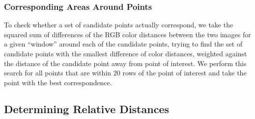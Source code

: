 \subsubsection{Corresponding Areas Around Points}
To check whether a set of candidate points actually correspond, we take the squared sum of differences of the RGB color distances between the two images for a given ``window'' around each of the candidate points, trying to find the set of candidate points with the smallest difference of color distances, weighted against the distance of the candidate point away from point of interest. We perform this search for all points that are within 20 rows of the point of interest and take the point with the best correspondence. 

\subsection{Determining Relative Distances}